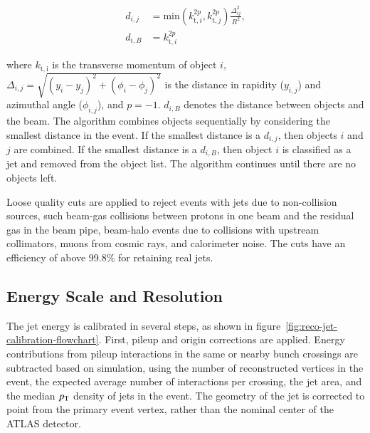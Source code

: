 \begin{align}
	d_{i,j} &= \mathrm{min}(k_{\mathrm{t}, i}^{2p}, k_{\mathrm{t}, j}^{2p}) \frac{\Delta_{ij}^2}{R^2}, \\
	d_{i,B} &= k_{\mathrm{t},i}^{2p}
\end{align}

where $k_{\mathrm{t,i}}$ is the transverse momentum of object $i$, $\Delta_{i,j}=\sqrt{(y_i-y_j)^2+(\phi_i-\phi_j)^2}$ is the distance in rapidity ($y_{i,j}$) and azimuthal angle ($\phi_{i,j}$), and $p=-1$. $d_{i,B}$ denotes the distance between objects and the beam. The algorithm combines objects sequentially by considering the smallest distance in the event. If the smallest distance is a $d_{i,j}$, then objects $i$ and $j$ are combined. If the smallest distance is a $d_{i,B}$, then object $i$ is classified as a jet and removed from the object list. The algorithm continues until there are no objects left. 

Loose quality cuts are applied to reject events with jets due to non-collision sources, such beam-gas collisions between protons in one beam and the residual gas in the beam pipe, beam-halo events due to collisions with upstream collimators, muons from cosmic rays, and calorimeter noise. The cuts have an efficiency of above 99.8\% for retaining real jets. 


\subsection{Energy Scale and Resolution}
The jet energy is calibrated in several steps, as shown in figure~\ref{fig:reco-jet-calibration-flowchart}. First, pileup and origin corrections are applied. Energy contributions from pileup interactions in the same or nearby bunch crossings are subtracted based on simulation, using the number of reconstructed vertices in the event, the expected average number of interactions per crossing, the jet area, and the median $p_{\text{T}}$ density of jets in the event. The geometry of the jet is corrected to point from the primary event vertex, rather than the nominal center of the ATLAS detector. 


